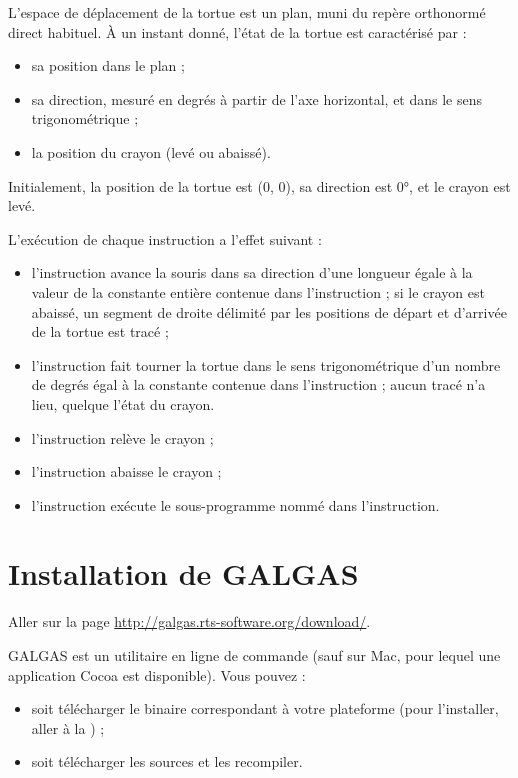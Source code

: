 
L'espace de déplacement de la tortue est un plan, muni du repère orthonormé direct habituel. À un instant donné, l'état de la tortue est caractérisé par :
\begin{itemize}
  \item sa position dans le plan ;
  \item sa direction, mesuré en degrés à partir de l'axe horizontal, et dans le sens trigonométrique ;
  \item la position du crayon (levé ou abaissé).
\end{itemize}

Initialement, la position de la tortue est (0, 0), sa direction est 0°, et le crayon est levé.

L'exécution de chaque instruction a l'effet suivant :
\begin{itemize}
  \item l'instruction  avance la souris dans sa direction d'une longueur égale à la valeur de la constante entière contenue dans l'instruction ; si le crayon est abaissé, un segment de droite délimité par les positions de départ et d'arrivée de la tortue est tracé ;
  \item l'instruction  fait tourner la tortue dans le sens trigonométrique d'un nombre de degrés égal à la constante contenue dans l'instruction ; aucun tracé n'a lieu, quelque l'état du crayon.
  \item l'instruction  relève le crayon ;
  \item l'instruction  abaisse le crayon ;
  \item l'instruction  exécute le sous-programme nommé dans l'instruction.
\end{itemize}











\section{Installation de GALGAS}

Aller sur la page \url{http://galgas.rts-software.org/download/}.

GALGAS est un utilitaire en ligne de commande (sauf sur Mac, pour lequel une application Cocoa est disponible). Vous pouvez :
\begin{itemize}
  \item soit télécharger le binaire correspondant à votre plateforme (pour l'installer, aller à la ) ;
  \item soit télécharger les sources et les recompiler.
\end{itemize}




